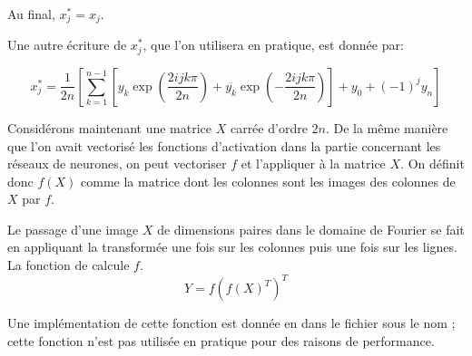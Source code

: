 Au final, $x^{*}_j = x_j$.

Une autre écriture de $x^{*}_j$, que l'on utilisera en pratique, est donnée par:

\[
x^{*}_j = \frac{1}{2n} \left[ \sum_{k=1}^{n-1} \left[ y_k \exp\left( \frac{2ijk\pi}{2n} \right) 
          + \overline{y_k} \exp\left(-\frac{2ijk\pi}{2n} \right) \right]
		  + y_0 + (-1)^{j} y_n \right]
\]


Considérons maintenant une matrice $X$ carrée d'ordre $2n$. 
De la même manière que l'on avait vectorisé les fonctions 
d'activation dans la partie concernant les réseaux de neurones, 
on peut vectoriser $f$ et l'appliquer à la matrice $X$. 
On définit donc $f(X)$ comme la matrice dont les colonnes sont 
les images des colonnes de $X$ par $f$.

Le passage d'une image $X$ de dimensions paires dans le domaine 
de Fourier se fait en appliquant la transformée une fois sur les 
colonnes puis une fois sur les lignes. 
La fonction  de  calcule $f$.
\[
Y = f(f(X)^T)^T
\]

Une implémentation de cette fonction est donnée en \Python dans le 
fichier  sous le nom ; cette 
fonction n'est pas utilisée en pratique pour des raisons de performance.